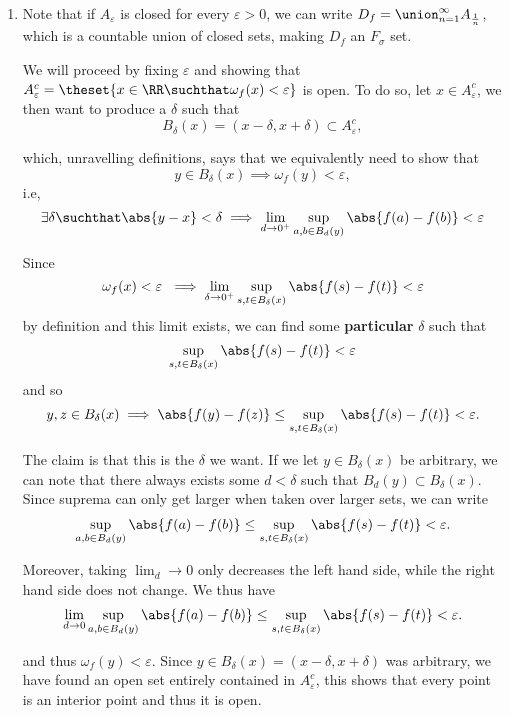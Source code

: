 \begin{solution}
\begin{enumerate}
  \item Note that if $A_\varepsilon$ is closed for every $\varepsilon > 0$, we can write $D_f = \union_{n=1}^\infty A_{\frac 1 n}$, which is a countable union of closed sets, making $D_f$ an $F_\sigma$ set.

  We will proceed by fixing $\varepsilon$ and showing that $A_\varepsilon^c = \theset{x\in \RR \suchthat \omega_f(x) < \varepsilon}$ is open. To do so, let $x\in A_\varepsilon^c$, we then want to produce a $\delta$ such that
  $$
  B_\delta(x) = (x-\delta, x+\delta) \subset A_\varepsilon^c,
  $$

  which, unravelling definitions, says that we equivalently need to show that
  $$
  y \in B_\delta(x) \implies \omega_f(y) < \varepsilon,
  $$
  i.e,
  $$
  \exists\delta \suchthat \abs{y - x} < \delta \implies
  \lim_{d \to 0^+} \sup_{a,b \in B_d(y)}\abs{f(a) - f(b)} < \varepsilon
  $$

  Since
  $$
  \omega_f(x) < \varepsilon\ \implies \lim_{\delta \to 0^+} \sup_{s,t \in B_\delta(x)} \abs{f(s) - f(t)} < \varepsilon
  $$
  by definition and this limit exists, we can find some \textbf{particular} $\delta$ such that
  $$
  \sup_{s, t \in B_{\delta}(x)} \abs{f(s) - f(t)} < \varepsilon
  $$
  and so
  $$
  y, z \in B_{\delta}(x) \implies  \abs{f(y) - f(z)} \leq \sup_{s, t \in B_{\delta}(x)} \abs{f(s) - f(t)} < \varepsilon.
  $$

  The claim is that this is the $\delta$ we want. If we let $y\in B_{\delta}(x)$ be arbitrary, we can note that there always exists some $d < \delta$ such that $B_{d}(y) \subset B_{\delta}(x)$. Since suprema can only get larger when taken over larger sets, we can write
  \[
  \begin{align*}
    \sup_{a,b \in B_d(y)} \abs{f(a) - f(b)}
    \leq \sup_{s, t \in B_{\delta}(x)} \abs{f(s) - f(t)}
    < \varepsilon
  .\end{align*}
  \]

  Moreover, taking $\lim_d\to 0$ only decreases the left hand side, while the right hand side does not change. We thus have
\[
  \begin{align*}
    \lim_{d \to 0} \sup_{a,b \in B_d(y)} \abs{f(a) - f(b)}
    \leq \sup_{s, t \in B_{\delta}(x)} \abs{f(s) - f(t)}
    < \varepsilon
  .\end{align*}
  \]

  and thus $\omega_f(y) < \varepsilon$. Since $y \in B_\delta(x) = (x-\delta, x+\delta)$ was arbitrary, we have found an open set entirely contained in $A_\varepsilon^c$, this shows that every point is an interior point and thus it is open.
\end{enumerate}
\end{solution}

